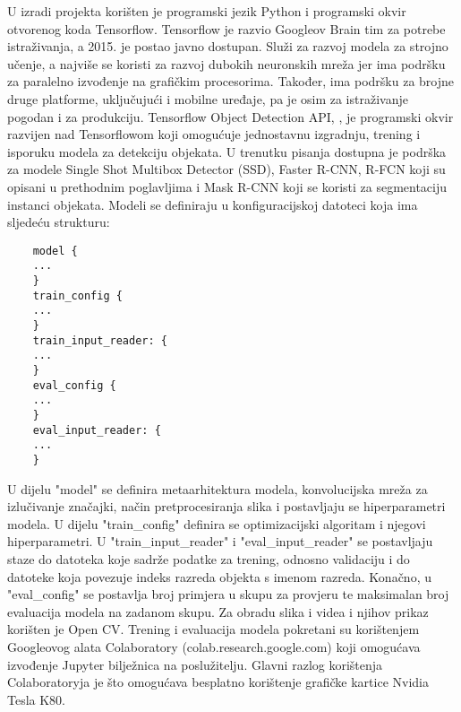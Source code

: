U izradi projekta korišten je programski jezik Python i programski okvir otvorenog koda Tensorflow. Tensorflow je razvio Googleov Brain tim za potrebe istraživanja, a 2015. je postao javno dostupan. Služi za razvoj modela za strojno učenje, a najviše se koristi za razvoj dubokih neuronskih mreža jer ima podršku za paralelno izvođenje na grafičkim procesorima. Također, ima podršku za brojne druge platforme, uključujući i mobilne uređaje, pa je osim za istraživanje pogodan i za produkciju. Tensorflow Object Detection API, \cite{DBLP:journals/corr/HuangRSZKFFWSG016}, je programski okvir razvijen nad Tensorflowom koji omogućuje jednostavnu izgradnju, trening i isporuku modela za detekciju objekata. U trenutku pisanja dostupna je podrška za modele Single Shot Multibox Detector (SSD), Faster R-CNN, R-FCN koji su opisani u prethodnim poglavljima i Mask R-CNN koji se koristi za segmentaciju instanci objekata. Modeli se definiraju u konfiguracijskoj datoteci koja ima sljedeću strukturu:
\begin{lstlisting}
	model {
	...
	}
	train_config {
	...
	}
	train_input_reader: {
	...
	}
	eval_config {
	...
	}
	eval_input_reader: {
	...
	}
\end{lstlisting}
U dijelu "model" se definira metaarhitektura modela, konvolucijska mreža za izlučivanje značajki, način pretprocesiranja slika i postavljaju se hiperparametri modela. U dijelu "train\_config" definira se optimizacijski algoritam i njegovi hiperparametri. U "train\_input\_reader" i "eval\_input\_reader" se postavljaju staze do datoteka koje sadrže podatke za trening, odnosno validaciju i do datoteke koja povezuje indeks razreda objekta s imenom razreda. Konačno, u "eval\_config" se postavlja broj primjera u skupu za provjeru te maksimalan broj evaluacija modela na zadanom skupu.
Za obradu slika i videa i njihov prikaz korišten je Open CV.
Trening i evaluacija modela pokretani su korištenjem Googleovog alata Colaboratory (colab.research.google.com) koji omogućava izvođenje Jupyter bilježnica na poslužitelju. Glavni razlog korištenja Colaboratoryja je što omogućava besplatno korištenje grafičke kartice Nvidia Tesla K80. 